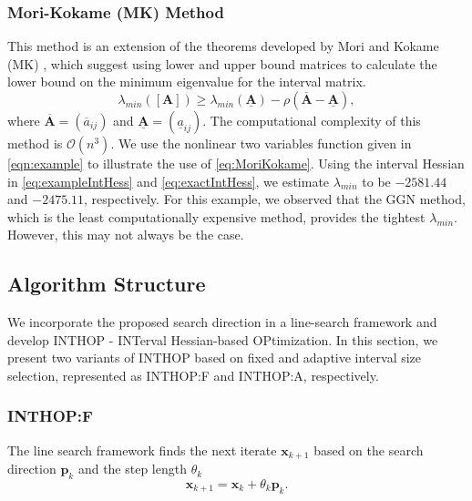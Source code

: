 \documentclass{elsarticle}
\numberwithin{equation}{section}
\begin{document}
\subsubsection{Mori-Kokame (MK) Method}
This method is an extension of the theorems developed by Mori and Kokame (MK) \cite{mori1994eigenvalue}, which suggest using lower and upper bound matrices to calculate the lower bound on the minimum eigenvalue for the interval matrix.
\begin{equation}
    \lambda_{min}([\mathbf{A}]) \geq \lambda_{min}(\underline{\mathbf{A}}) - \rho(\overline{\mathbf{A}} - \underline{\mathbf{A}}),
    \label{eq:MoriKokame}
\end{equation}
where $\overline{\mathbf{A}} = (\overline{a}_{ij})$ and $\underline{\mathbf{A}} = (\underline{a}_{ij})$.
The computational complexity of this method is $\mathcal{O}(n^3)$. We use the nonlinear two variables function given in \eqref{eqn:example} to illustrate the use of \eqref{eq:MoriKokame}. Using the interval Hessian in  \eqref{eq:exampleIntHess} and \eqref{eq:exactIntHess}, we estimate $\lambda_{min}$ to be $-2581.44$ and $-2475.11$, respectively. For this example, we observed that the GGN method, which is the least computationally expensive method, provides the tightest $\lambda_{min}$. However, this may not always be the case.  
\subsection{Algorithm Structure}
We incorporate the proposed search direction in a line-search framework and develop INTHOP - INTerval Hessian-based OPtimization. In this section, we present two variants of INTHOP based on fixed and adaptive interval size selection, represented as INTHOP:F and INTHOP:A, respectively.
\subsubsection{INTHOP:F}
The line search framework finds the next iterate $\mathbf{x}_{k+1}$ based on the search direction $\mathbf{p}_k$ and the step length $\theta_k$
\begin{equation}
    \mathbf{x}_{k+1} = \mathbf{x}_k+\theta_k\mathbf{p}_k.
\end{equation}
\end{document}
